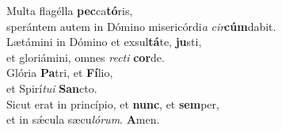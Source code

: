 \oddverse Multa flagélla \textbf{pec}ca\textbf{tó}ris,~\*\\
\oddverse sperántem autem in Dómino misericórdi\textit{a} \textit{cir}\textbf{cúm}dabit.\\
\evenverse Lætámini in Dómino et exsul\textbf{tá}te, \textbf{ju}sti,~\*\\
\evenverse et gloriámini, omnes \textit{re}\textit{cti} \textbf{cor}de.\\
\oddverse Glória \textbf{Pa}tri, et \textbf{Fí}lio,~\*\\
\oddverse et Spirí\textit{tu}\textit{i} \textbf{San}cto.\\
\evenverse Sicut erat in princípio, et \textbf{nunc}, et \textbf{sem}per,~\*\\
\evenverse et in sǽcula sæcu\textit{ló}\textit{rum}. \textbf{A}men.\\
